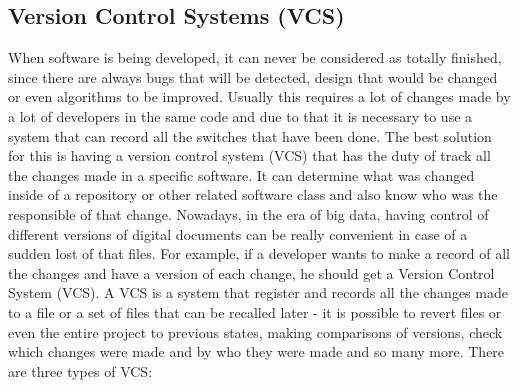 \documentclass[mim_thesis.tex]{subfiles}
\begin{document}
\subsection{Version Control Systems (VCS)}
When software is being developed, it can never be considered as totally finished, since there are always bugs that will be detected, design that would be changed or even algorithms to be improved. Usually this requires a lot of changes made by a lot of developers in the same code and due to that it is necessary to use a system that can record all the switches that have been done. The best solution for this is having a version control system (VCS) that has the duty of track all the changes made in a specific software. It can determine what was changed inside of a repository or other related software class and also know who was the responsible of that change. Nowadays, in the era of big data, having control of different versions of digital documents can be really convenient in case of a sudden lost of that files. For example, if a developer wants to make a record of all the changes and have a version of each change, he should get a Version Control System (VCS). A VCS is a system that register and records all the changes made to a file or a set of files that can be recalled later - it is possible to revert files or even the entire project to previous states, making comparisons of versions, check which changes were made and by who they were made and so many more. There are three types of VCS:   
\end{document}
